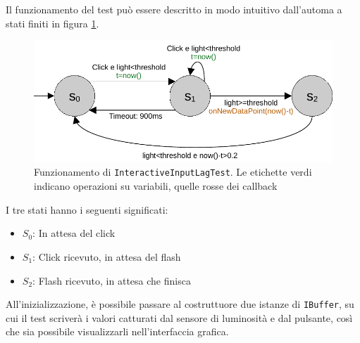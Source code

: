 Il funzionamento del test può essere descritto in modo intuitivo dall'automa a stati finiti in figura \ref{fig:interactiveInputLagTest_fsm}.

\begin{figure}[H]
	\centering
	\includegraphics[width=.8\textwidth]{Chapter04/res/interactiveInputLagTest_fsm.pdf}
	\caption{Funzionamento di \texttt{InteractiveInputLagTest}. Le etichette verdi indicano operazioni su variabili, quelle rosse dei callback}
	\label{fig:interactiveInputLagTest_fsm}
\end{figure}

I tre stati hanno i seguenti significati:\begin{itemize}
	\item \textbf{$S_0$}: In attesa del click
	\item \textbf{$S_1$}: Click ricevuto, in attesa del flash
	\item \textbf{$S_2$}: Flash ricevuto, in attesa che finisca
\end{itemize}

All'inizializzazione, è possibile passare al costruttuore due istanze di \texttt{IBuffer}, su cui il test scriverà i valori catturati dal sensore di luminosità e dal pulsante, così che sia possibile visualizzarli nell'interfaccia grafica.

